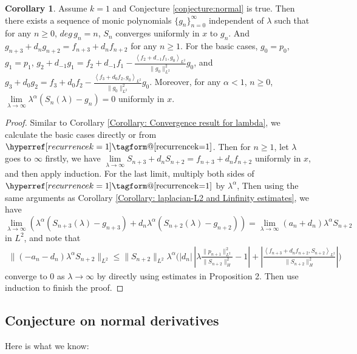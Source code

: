 \documentclass[12pt]{amsart}
\makeatletter
\renewcommand*{\eqref}[1]{%
  \hyperref[{#1}]{\textup{\tagform@{\ref*{#1}}}}%
}
\theoremstyle{plain}
\theoremstyle{definition}
\newtheorem{corollary}{Corollary}[section]
\newcommand{\inner}[2]{\left \langle #1, #2\right \rangle}
\makeatother
\begin{document}
\begin{corollary} Assume $k=1$ and Conjecture \ref{conjecture:normal} is true. Then there exists a sequence of monic polynomials $\{g_n\}_{n=0}^{\infty}$ independent of $\lambda$ such that for any $n\ge0$, $deg\, g_n=n$, $S_n$ converges uniformly in $x$ to $g_n$. And $g_{n+3}+d_ng_{n+2}=f_{n+3}+d_nf_{n+2}$ for any $n\ge 1$. For the basic cases, $g_0=p_0$, $g_1=p_1$, $g_{2}+d_{-1}g_{1}=f_{2}+d_{-1}f_{1}-\frac{\inner{f_2+d_{-1}f_1}{g_0}_{L^2}}{{\|g_0\|_{L^2}^2}}g_{0}$, and 
$g_{3}+d_{0}g_{2}=f_{3}+d_{0}f_{2}-\frac{\inner{f_3+d_{0}f_2}{g_0}_{L^2}}{{\|g_0\|_{L^2}^2}}g_{0}$. Moreover, for any $\alpha<1$, $n\ge0$, $\lim\limits_{\lambda \rightarrow\infty}\lambda^\alpha(S_n(\lambda)-g_n)=0$ uniformly in $x$.
\begin{proof}
Similar to Corollary \ref{Corollary: Convergence result for lambda}, we calculate the basic cases directly or from $\eqref{recurrencek=1}$. Then for $n\ge 1$, let $\lambda$ goes to $\infty$ firstly, we have $\lim\limits_{\lambda\rightarrow\infty} S_{n+3}+d_nS_{n+2}=f_{n+3}+d_nf_{n+2}$ uniformly in $x$, and then apply induction. For the last limit, multiply both sides of $\eqref{recurrencek=1}$ by $\lambda^\alpha$, Then using the same arguments as Corollary \ref{Corollary: laplacian-L2 and Linfinity estimates}, we have $\lim\limits_{\lambda\rightarrow\infty} (\lambda^\alpha(S_{n+3}(\lambda)-g_{n+3})+d_n\lambda^\alpha(S_{n+2}(\lambda)-g_{n+2}))=\lim\limits_{\lambda\rightarrow\infty}(a_n+d_n)\lambda^{\alpha}S_{n+2}$ in $L^2$, and note that
\begin{align}
    \|(-a_n-d_n)\lambda^{\alpha}S_{n+2}\|_{L^2}\le\|S_{n+2}\|_{L^2}\lambda^{\alpha}\Big(|d_n|\,|\lambda \frac{\|p_{n+1}\|_{L^2}^2}{\|S_{n+2}\|_H^2}-1|+|\frac{\inner{f_{n+3}+d_nf_{n+2}}{S_{n+2}}_{L^2}}{\|S_{n+2}\|_H^2}|\Big)
\end{align}
converge to $0$ as ${\lambda\rightarrow\infty}$ by directly using estimates in Proposition 2. Then use induction to finish the proof.
\end{proof}
\end{corollary}

   
\subsection{Conjecture on normal derivatives}

Here is what we know: 
\end{document}
